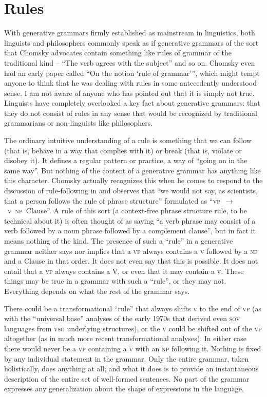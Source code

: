 \documentclass[output=paper]{langscibook}
\begin{document}
\section{Rules}
\label{sec:pullum:rules}

With generative grammars firmly established as mainstream in linguistics, both linguists and philosophers commonly speak as if generative grammars of the sort that Chomsky advocates contain something like rules of grammar of the traditional kind -- ``The verb agrees with the subject'' and so on. Chomsky even had an early paper called ``On the notion `rule of grammar'\thinspace'', which might tempt anyone to think that he was dealing with rules in some antecedently understood sense. I am not aware of anyone who has pointed out that it is simply not true. Linguists have completely overlooked a key fact about generative grammars: that they do not consist of rules in any sense that would be recognized by traditional grammarians or non-linguists like philosophers.

The ordinary intuitive understanding of a rule is something that we can follow (that is, behave in a way that complies with it) or break (that is, violate or disobey it).  It defines a regular pattern or practice, a way of ``going on in the same way''.  But nothing of the content of a generative grammar has anything like this character. Chomsky actually recognizes this when he comes to respond to the discussion of rule-following in \citet{Kripke82} and observes \citep[243]{Chomsky86KL} that ``we would not say, as scientists, that a person follows the rule of phrase structure'' formulated as ``\textsc{vp}~$\rightarrow$~\textsc{v}~\textsc{np}~Clause''.  A rule of this sort (a context-free phrase structure rule, to be technical about it) is often thought of as saying ``a verb phrase may consist of a verb followed by a noun phrase followed by a complement clause'', but in fact it means nothing of the kind.  The presence of such a ``rule'' in a generative grammar neither says nor implies that a \textsc{vp} always contains a \textsc{v} followed by a \textsc{np} and a Clause in that order.  It does not even say that this is possible.  It does not entail that a \textsc{vp} always contains a V, or even that it may contain a \textsc{v}.  These things may be true in a grammar with such a ``rule'', or they may not. Everything depends on what the rest of the grammar says.

There could be a transformational ``rule'' that always shifts \textsc{v} to the end of \textsc{vp} (as with the ``universal base'' analyses of the early 1970s that derived even \textsc{sov} languages from \textsc{vso} underlying structures), or the \textsc{v} could be shifted out of the \textsc{vp} altogether (as in much more recent transformational analyses).  In either case there would never be a \textsc{vp} containing a \textsc{v} with an \textsc{np} following it. Nothing is fixed by any individual statement in the grammar. Only the entire grammar, taken holistically, does anything at all; and what it does is to provide an instantaneous description of the entire set of well-formed sentences. No part of the grammar expresses any generalization about the shape of expressions in the language.
\end{document}
